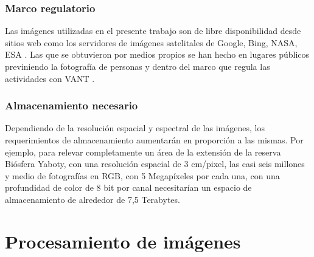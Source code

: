 \subsubsection{Marco regulatorio} %
Las imágenes utilizadas en el presente trabajo son de libre disponibilidad desde sitios web como los servidores de imágenes satelitales de Google, Bing, NASA, ESA \cite{noauthor_google_nodate, noauthor_mapas_nodate, noauthor_nasa_nodate, noauthor_home_nodate}. Las que se obtuvieron por medios propios se han hecho en lugares públicos previniendo la fotografía de personas y dentro del marco que regula las actividades con VANT \cite{noauthor_regulacion_2020}. 
\subsubsection{Almacenamiento necesario} %
Dependiendo de la resolución espacial y espectral de las imágenes, los requerimientos de almacenamiento aumentarán en proporción a las mismas. Por ejemplo, para relevar completamente un área de la extensión de la reserva Biósfera Yaboty, con una resolución espacial de 3 cm/pixel, las casi seis millones y medio de fotografías en RGB, con 5 Megapíxeles por cada una, con una profundidad de color de 8 bit por canal necesitarían un espacio de almacenamiento de alrededor de 7,5 Terabytes.

\section{Procesamiento de imágenes} \label{Metodo bloque 2}


